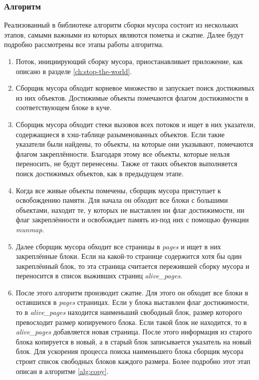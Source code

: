 \documentclass[14pt]{matmex-diploma}
\begin{document}
\subsubsection{Алгоритм}
Реализованный в библиотеке алгоритм сборки мусора состоит из нескольких этапов, самыми важными из которых являются пометка и сжатие. Далее будут подробно рассмотрены все этапы работы алгоритма.
\begin{enumerate}
\item Поток, инициирующий сборку мусора, приостанавливает приложение, как описано в разделе \ref{ch:stop-the-world}.
\item Сборщик мусора обходит корневое множество и запускает поиск достижимых из них объектов. Достижимые объекты помечаются флагом достижимости в соответствующем блоке в куче.
\item Сборщик мусора обходит стеки вызовов всех потоков и ищет в них указатели, содержащиеся в  хэш-таблице разыменованных объектов. Если такие указатели были найдены, то объекты, на которые они указывают, помечаются флагом закреплённости.
Благодаря этому все объекты, которые нельзя переносить, не будут перенесены. Также от таких объектов выполняется поиск достижимых объектов, как в предыдущем этапе. \label{step:deref}
\item Когда все живые объекты помечены, сборщик мусора приступает к освобождению памяти. Для начала он обходит все блоки с большими объектами, находит те, у которых не выставлен ни флаг достижимости, ни флаг закреплённости и освобождает память из-под них с помощью функции \textit{munmap}.
\item Далее сборщик мусора обходит все страницы в \textit{pages} и ищет в них закреплённые блоки. Если на какой-то странице содержится хотя бы один закреплённый блок, то эта страница считается пережившей сборку мусора и переносится в список выживших страниц \textit{alive\_pages}.
\item После этого алгоритм производит сжатие. Для этого он обходит все блоки в оставшихся в \textit{pages} страницах. Если у блока выставлен флаг достижимости, то в \textit{alive\_pages} находится наименьший свободный блок, размер которого превосходит размер копируемого блока. Если такой блок не находится, то в \textit{alive\_pages} добавляется новая страница. После этого информация из старого блока копируется в новый, а в старый блок записывается указатель на новый блок. Для ускорения процесса поиска наименьшего блока сборщик мусора строит список свободных блоков каждого размера. Более подробно этот этап описан в алгоритме \ref{alg:copy}.

\end{enumerate}
\end{document}
